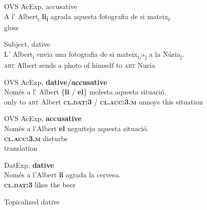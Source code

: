 \documentclass[output=paper,colorlinks,citecolor=brown,nonflat]{./langscibook}
\begin{document}
 \ex OVS AcExp, {accusative}\label{ex:royo:8c}\\
 \gll A l’ Albert\textsubscript{i} \textbf{li\textsubscript{i}} agrada aquesta fotografia de si mateix\textsubscript{i}.\\
gloss\\
\glt {}
 
  \ex Subject, dative\label{ex:royo:8d}\\
 \gll L’ Albert\textsubscript{i} envia una fotografia de si mateix\textsubscript{i/*j} a la Núria\textsubscript{j}.\\
 \textsc{art} Albert sends a photo of himself to \textsc{art} Nuria\\
\glt {}
 
 \z
 \z

\ea%
 \label{ex:royo:9}
 \ea OVS AcExp, \textbf{dative/accusative} \label{ex:royo:9a}\\
 \gll Només a l’ Albert \{\textbf{li} / \textbf{el}\} molesta aquesta situació. \\
 only to \textsc{art} Albert \textbf{\textsc{cl.dat:3}} / \textbf{\textsc{cl.acc:3.m}} annoys this situation \\
\glt {}
 
 \ex OVS AcExp, \textbf{accusative} \label{ex:royo:9b}\\
 \gll Només a l’Albert \textbf{el} neguiteja aquesta situació.\\
  \textbf{\textsc{cl.acc:3.m}} disturbs  \\
 \glt  translation
 
  \ex DatExp, \textbf{dative} \label{ex:royo:9c}\\
 \gll   Només a l’Albert \textbf{li} agrada la cervesa. \\
 \textbf{\textsc{cl.dat:3}} likes the beer    \\
\glt {}
 
 \ex Topicalized dative \label{ex:royo:9d}\\
 
 \z
 \z
 
\end{document}
